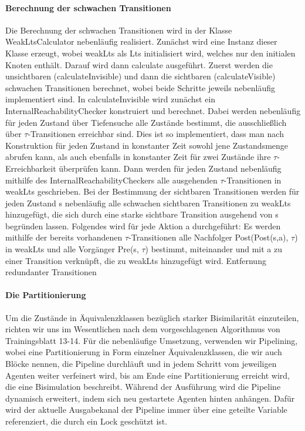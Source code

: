 \documentclass[a4paper]{scrartcl}
\begin{document}
\paragraph*{Berechnung der schwachen Transitionen}
Die Berechnung der schwachen Transitionen wird in der Klasse WeakLtsCalculator nebenläufig realisiert. Zunächst wird eine Instanz dieser Klasse erzeugt, wobei weakLts als Lts initialisiert wird, welches nur den initialen Knoten  enthält. Darauf wird dann calculate ausgeführt. Zuerst werden die unsichtbaren (calculateInvisible) und dann die sichtbaren (calculateVisible) schwachen Transitionen berechnet, wobei beide Schritte jeweils nebenläufig implementiert sind.
In calculateInvisible wird zunächst ein InternalReachabilityChecker konstruiert und berechnet. Dabei werden nebenläufig für jeden Zustand über Tiefensuche alle Zustände bestimmt, die ausschließlich über $\tau$-Transitionen erreichbar sind. Dies ist so implementiert, dass man nach Konstruktion für jeden Zustand in konstanter Zeit sowohl jene Zustandsmenge abrufen kann, als auch ebenfalls in konstanter Zeit für zwei Zustände ihre $\tau$-Erreichbarkeit überprüfen kann. Dann werden für jeden Zustand nebenläufig mithilfe des InternalReachabilityCheckers alle ausgehenden $\tau$-Transitionen in weakLts geschrieben.
Bei der Bestimmung der sichtbaren Transitionen werden für jeden Zustand s nebenläufig alle schwachen sichtbaren Transitionen zu weakLts hinzugefügt, die sich durch eine starke sichtbare Transition ausgehend von s begründen lassen. Folgendes wird für jede Aktion a durchgeführt: Es werden mithilfe der bereits vorhandenen $\tau$-Transitionen alle Nachfolger Post(Post(s,a), $\tau$) in weakLts und alle Vorgänger Pre(s, $\tau$) bestimmt, miteinander und mit a zu einer Transition verknüpft, die zu weakLts hinzugefügt wird.
Entfernung redundanter Transitionen

\paragraph*{Die Partitionierung}
Um die Zustände in Äquivalenzklassen bezüglich starker Bisimilarität einzuteilen, richten wir uns im Wesentlichen nach dem vorgeschlagenen Algorithmus von Trainingsblatt 13-14. Für die nebenläufige Umsetzung, verwenden wir Pipelining, wobei eine Partitionierung in Form einzelner Äquivalenzklassen, die wir auch Blöcke nennen, die Pipeline durchläuft und in jedem Schritt vom jeweiligen Agenten weiter verfeinert wird, bis am Ende eine Partitionierung erreicht wird, die eine Bisimulation beschreibt. Während der Ausführung wird die Pipeline dynamisch erweitert, indem sich neu gestartete Agenten hinten anhängen. Dafür wird der aktuelle Ausgabekanal der Pipeline immer über eine geteilte Variable referenziert, die durch ein Lock geschützt ist.
\end{document}
